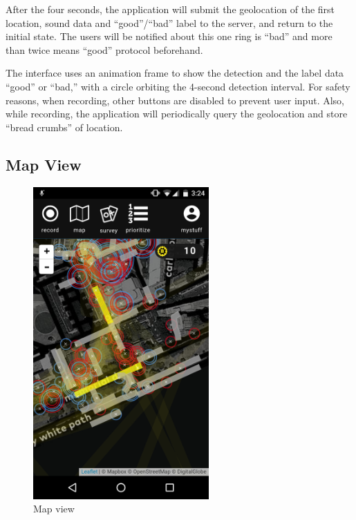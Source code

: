 After the four seconds, the application will submit the geolocation of the first location, sound data and ``good''/``bad'' label to the server, and return to the initial state. The users will be notified about this one ring is ``bad'' and more than twice means ``good'' protocol beforehand.

The interface uses an animation frame to show the detection and the label data “good” or “bad,” with a circle orbiting the 4-second detection interval. For safety reasons, when recording, other buttons are disabled to prevent user input. Also, while recording, the application will periodically query the geolocation and store “bread crumbs” of location.

\subsection{Map View}

\begin{figure}[htb]
  \includegraphics[width=0.6\textwidth]{chapters/4/fig/interface_map.png}               
  \caption[interface: Map]{Map view}
  \label{fig:interface_map}
\end{figure}

